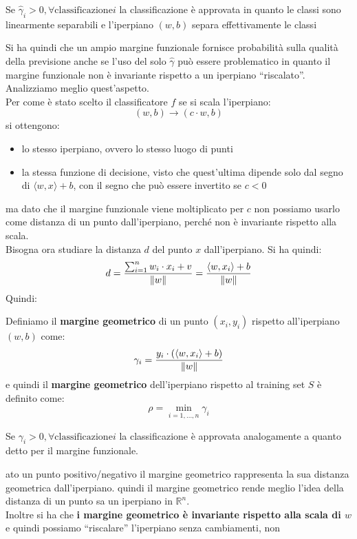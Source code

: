 \begin{definizione}
  Se $\hat{\gamma}_i>0,\forall \mbox{classificazione} i$ la classificazione è
  approvata in quanto le classi sono linearmente separabili e l'iperpiano
  $(w, b)$ separa effettivamente le classi
\end{definizione}
Si ha quindi che un ampio margine funzionale fornisce probabilità sulla qualità
della previsione anche se l'uso del solo $\hat{\gamma}$ può essere problematico
in quanto il margine funzionale non è invariante rispetto a un iperpiano
``riscalato''. Analizziamo meglio quest'aspetto.\\
Per come è stato scelto il classificatore $f$ se si scala l'iperpiano:
\[(w, b)\to(c\cdot w, b)\]
si ottengono:
\begin{itemize}
  \item lo stesso iperpiano, ovvero lo stesso luogo di punti
  \item la stessa funzione di decisione, visto che quest'ultima dipende solo dal
  segno di $\langle w, x\rangle+b$, con il segno che può essere invertito se
  $c<0$ 
\end{itemize}
ma dato che il margine funzionale viene moltiplicato per $c$ non possiamo usarlo
come distanza di un punto dall’iperpiano, perché non è invariante rispetto alla
scala.\\
Bisogna ora studiare la distanza $d$ del punto $x$ dall'iperpiano. Si ha quindi:
\[d = \frac{\sum_{i=1}^n w_i\cdot x_i+v}{\norm{w}}=\frac{\langle w,
    x_i\rangle +b}{\norm{w}} \]
Quindi:
\begin{definizione}
  Definiamo il \textbf{margine geometrico} di un punto $(x_i, y_i)$ rispetto
  all'iperpiano $(w, b)$ come:
  \[\gamma_i=\frac{y_i\cdot(\langle w, x_i\rangle+b)}{\norm{w}}\]
  e quindi il \textbf{margine geometrico} dell'iperpiano rispetto al training
  set $S$ è definito come:
  \[\rho=\min_{i=1,\ldots, n}\gamma_i\]
\end{definizione}
\begin{definizione}
  Se $\gamma_i>0,\forall \mbox{classificazione} i$ la classificazione è
  approvata analogamente a quanto detto per il margine funzionale.
\end{definizione}
ato un punto positivo/negativo il margine geometrico rappresenta la sua
distanza geometrica dall'iperpiano. quindi il margine geometrico rende meglio
l'idea della distanza di un punto sa un iperpiano in $\mathbb{R}^n$.\\
Inoltre si ha che \textbf{i margine geometrico è invariante rispetto alla scala
  di $w$} e quindi possiamo ``riscalare'' l'iperpiano senza cambiamenti, non
